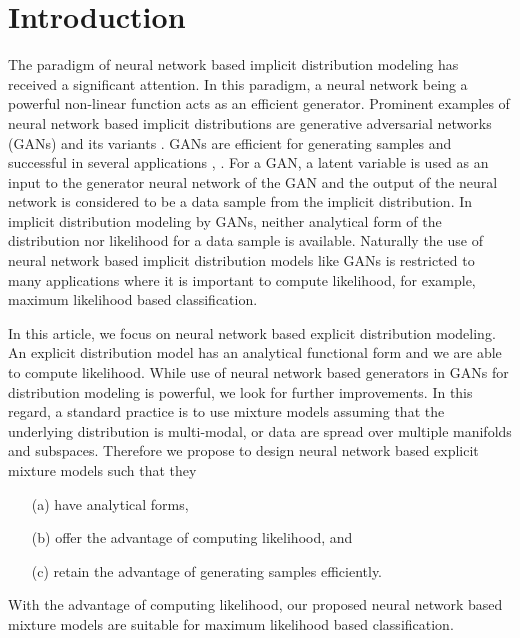 \section{Introduction}

The paradigm of neural network based implicit distribution
modeling has received a significant attention. In this paradigm, a neural network being a powerful non-linear function acts as an efficient generator. Prominent examples of neural network based implicit distributions are generative adversarial networks (GANs) \cite{NIPS2014_5423} and its
variants \cite{NIPS2016_6125,
  2018arXiv180508318Z, salimans2018improving}. GANs are efficient for generating samples and successful in several applications \cite{ledig2017photo}, \cite{NIPS2016_6125}. For a GAN, a latent variable is used as
an input to the generator neural network of the GAN and the output of the
neural network is considered to be a data sample from the implicit
distribution.  In implicit distribution modeling by GANs, neither
analytical form of the distribution nor likelihood for a data sample
is available. Naturally the use of neural network based implicit distribution models like GANs is restricted to many applications where it is important to compute likelihood, for example, maximum likelihood based classification.


In this article, we focus on neural network based explicit distribution modeling. An explicit distribution model has an analytical functional form and we are able to compute likelihood. While use of neural network based generators in GANs for distribution modeling is powerful, we look for further improvements. In this regard, a standard practice is to use mixture models assuming that the underlying distribution is multi-modal, or data are spread over multiple manifolds and subspaces. Therefore we propose to design neural network based explicit mixture models such that they
\begin{enumerate}
\item[(a)] have analytical forms, 
\item[(b)] offer the advantage of computing likelihood, and 
\item[(c)] retain the advantage of generating samples efficiently.
\end{enumerate}
With the advantage of computing likelihood, our proposed neural network based mixture models are suitable for maximum likelihood based classification. 

